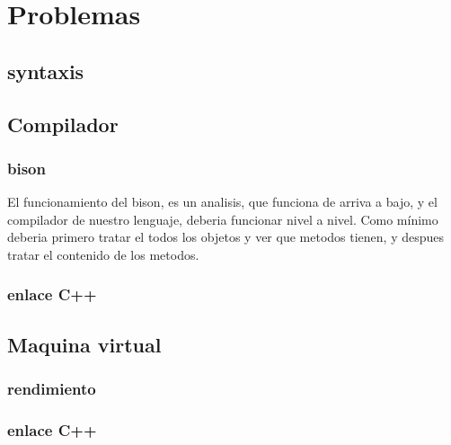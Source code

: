 \chapter {Problemas}

\section {syntaxis}

\section {Compilador}
\subsection {bison}
El funcionamiento del bison, es un analisis, que funciona de arriva a bajo, y
el compilador de nuestro lenguaje, deberia funcionar nivel a nivel. Como m\'inimo
deberia primero tratar el todos los objetos y ver que metodos tienen, y despues
tratar el contenido de los metodos.

\subsection {enlace C++}

\section {Maquina virtual}
\subsection {rendimiento}
\subsection {enlace C++}
